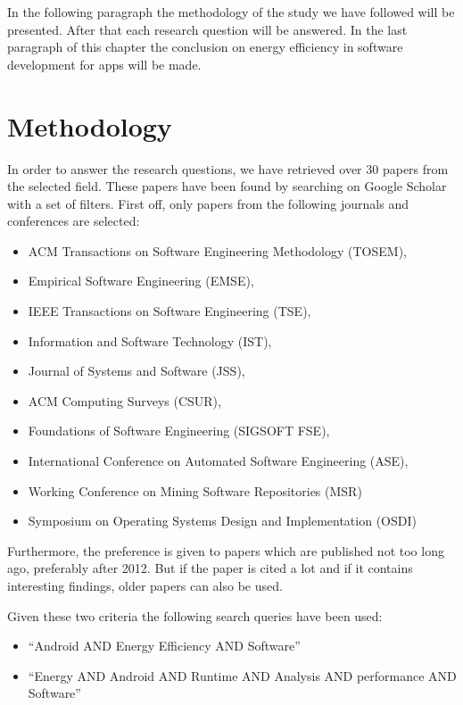 \documentclass[]{book}
\providecommand{\tightlist}{%
  \setlength{\itemsep}{0pt}\setlength{\parskip}{0pt}}
\begin{document}
In the following paragraph the methodology of the study we have followed
will be presented. After that each research question will be answered.
In the last paragraph of this chapter the conclusion on energy
efficiency in software development for apps will be made.

\section{Methodology}\label{methodology}

In order to answer the research questions, we have retrieved over 30
papers from the selected field. These papers have been found by
searching on Google Scholar with a set of filters. First off, only
papers from the following journals and conferences are selected:

\begin{itemize}
\tightlist
\item
  ACM Transactions on Software Engineering Methodology (TOSEM),
\item
  Empirical Software Engineering (EMSE),
\item
  IEEE Transactions on Software Engineering (TSE),
\item
  Information and Software Technology (IST),
\item
  Journal of Systems and Software (JSS),
\item
  ACM Computing Surveys (CSUR),
\item
  Foundations of Software Engineering (SIGSOFT FSE),
\item
  International Conference on Automated Software Engineering (ASE),
\item
  Working Conference on Mining Software Repositories (MSR)
\item
  Symposium on Operating Systems Design and Implementation (OSDI)
\end{itemize}

Furthermore, the preference is given to papers which are published not
too long ago, preferably after 2012. But if the paper is cited a lot and
if it contains interesting findings, older papers can also be used.

Given these two criteria the following search queries have been used:

\begin{itemize}
\tightlist
\item
  ``Android AND Energy Efficiency AND Software''
\item
  ``Energy AND Android AND Runtime AND Analysis AND performance AND
  Software''
\end{itemize}
\end{document}
